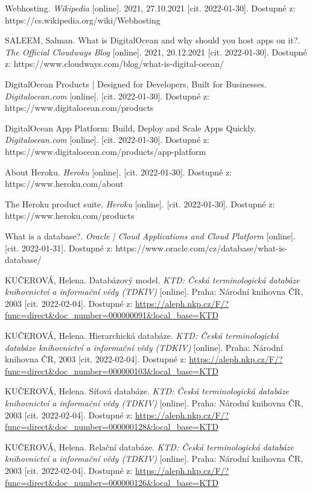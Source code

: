 \begin{thebibliography}{55}
Webhosting. \textit{Wikipedia} [online]. 2021, 27.10.2021 [cit. 2022-01-30]. Dostupné z: https://cs.wikipedia.org/wiki/Webhosting

SALEEM, Salman. What is DigitalOcean and why should you host apps on it?. \textit{The Official Cloudways Blog} [online]. 2021, 20.12.2021 [cit. 2022-01-30]. Dostupné z: https://www.cloudways.com/blog/what-is-digital-ocean/

DigitalOcean Products | Designed for Developers, Built for Businesses. \textit{Digitalocean.com} [online]. [cit. 2022-01-30]. Dostupné z: https://www.digitalocean.com/products

DigitalOcean App Platform: Build, Deploy and Scale Apps Quickly. \textit{Digitalocean.com} [online]. [cit. 2022-01-30]. Dostupné z: https://www.digitalocean.com/products/app-platform

About Heroku. \textit{Heroku} [online]. [cit. 2022-01-30]. Dostupné z: https://www.heroku.com/about

The Heroku product suite. \textit{Heroku} [online]. [cit. 2022-01-30]. Dostupné z: https://www.heroku.com/products

What is a database?. \textit{Oracle | Cloud Applications and Cloud Platform} [online]. [cit. 2022-01-31]. Dostupné z: https://www.oracle.com/cz/database/what-is-database/

KUČEROVÁ, Helena. Databázový model. \textit{KTD: Česká terminologická databáze knihovnictví a informační vědy (TDKIV)} [online]. Praha: Národní knihovna ČR, 2003 [cit. 2022-02-04]. Dostupné z: \url{https://aleph.nkp.cz/F/?func=direct&doc\_number=000000091&local\_base=KTD}

KUČEROVÁ, Helena. Hierarchická databáze. \textit{KTD: Česká terminologická databáze knihovnictví a informační vědy (TDKIV)} [online]. Praha: Národní knihovna ČR, 2003 [cit. 2022-02-04]. Dostupné z: \url{https://aleph.nkp.cz/F/?func=direct&doc\_number=000000103&local\_base=KTD}

KUČEROVÁ, Helena. Síťová databáze. \textit{KTD: Česká terminologická databáze knihovnictví a informační vědy (TDKIV)} [online]. Praha: Národní knihovna ČR, 2003 [cit. 2022-02-04]. Dostupné z: \url{https://aleph.nkp.cz/F/?func=direct&doc\_number=000000128&local\_base=KTD}

KUČEROVÁ, Helena. Relační databáze. \textit{KTD: Česká terminologická databáze knihovnictví a informační vědy (TDKIV)} [online]. Praha: Národní knihovna ČR, 2003 [cit. 2022-02-04]. Dostupné z: \url{https://aleph.nkp.cz/F/?func=direct&doc\_number=000000126&local\_base=KTD}


\end{thebibliography}
